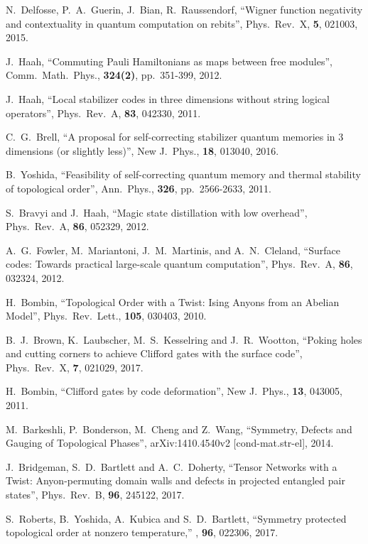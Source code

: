 \documentclass[pra,twocolumn,a4paper,nofootinbib]{revtex4-1}
\begin{document}
\begin{thebibliography}{99}
N.~Delfosse, P.~A.~Guerin, J.~Bian, R.~Raussendorf, ``Wigner function negativity and contextuality in quantum computation on rebits'', Phys.~Rev.~X, \textbf{5}, 021003, 2015.

J.~Haah, ``Commuting Pauli Hamiltonians as maps between free modules'',  Comm.~Math.~Phys., \textbf{324(2)}, pp.~351-399, 2012.

J.~Haah, ``Local stabilizer codes in three dimensions without string logical operators'', Phys.~Rev.~A, \textbf{83}, 042330, 2011.

C.~G.~Brell, ``A proposal for self-correcting stabilizer quantum memories in 3 dimensions (or slightly less)'', New J.~Phys., \textbf{18}, 013040, 2016.

B.~Yoshida, ``Feasibility of self-correcting quantum memory and thermal stability of topological order'',  Ann.~Phys., \textbf{326}, pp.~2566-2633, 2011.

S.~Bravyi and J.~Haah, ``Magic state distillation with low overhead'', Phys.~Rev.~A, \textbf{86}, 052329, 2012.

 A.~G.~Fowler, M.~Mariantoni, J.~M.~Martinis, and A.~N.~Cleland, ``Surface codes: Towards practical large-scale quantum computation'', Phys.~Rev.~A, \textbf{86}, 032324, 2012.

H.~Bombin, ``Topological Order with a Twist: Ising Anyons from an Abelian Model'', Phys.~Rev.~Lett., \textbf{105}, 030403, 2010.

B.~J.~Brown, K.~Laubscher, M.~S.~Kesselring and J.~R.~Wootton, ``Poking holes and cutting corners to achieve Clifford gates with the surface code'', Phys.~Rev.~X, \textbf{7}, 021029, 2017.

H.~Bombin, ``Clifford gates by code deformation'', New J.~Phys., \textbf{13}, 043005, 2011.

M.~Barkeshli, P.~Bonderson, M.~Cheng and Z.~Wang, ``Symmetry, Defects and Gauging of Topological Phases'', arXiv:1410.4540v2 [cond-mat.str-el], 2014.

J.~Bridgeman, S.~D.~Bartlett and A.~C.~Doherty, ``Tensor Networks with a Twist: Anyon-permuting domain walls and defects in projected entangled pair states'', Phys.~Rev.~B, \textbf{96}, 245122, 2017.

 S.~Roberts, B.~Yoshida, A.~Kubica and S.~D.~Bartlett, ``Symmetry protected topological order at nonzero temperature,'' \pra, \textbf{96}, 022306, 2017.

\end{thebibliography}
\end{document}
